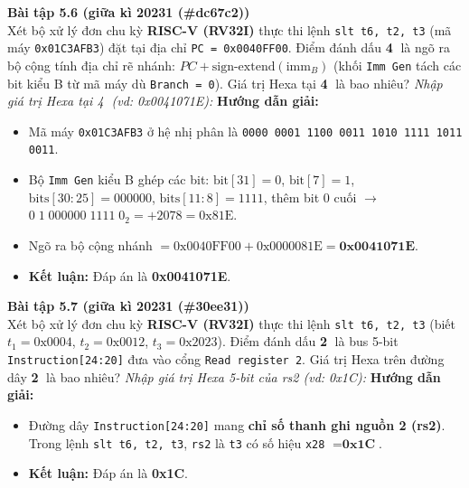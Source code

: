 \textbf{Bài tập 5.6 (giữa kì 20231 (\#dc67c2))}\\
Xét bộ xử lý đơn chu kỳ \textbf{RISC-V (RV32I)} thực thi lệnh \texttt{slt t6, t2, t3} (mã máy \texttt{0x01C3AFB3}) đặt tại địa chỉ \texttt{PC = 0x0040FF00}. Điểm đánh dấu \textbf{\textcircled{4}} là ngõ ra bộ cộng tính địa chỉ rẽ nhánh: $PC + \text{sign-extend}(\text{imm}_B)$ (khối \texttt{Imm Gen} tách các bit kiểu B từ mã máy dù \texttt{Branch = 0}). Giá trị Hexa tại \textbf{\textcircled{4}} là bao nhiêu?
\textit{Nhập giá trị Hexa tại \textcircled{4} (vd: 0x0041071E):}
\textbf{Hướng dẫn giải:}
\begin{itemize}
    \item Mã máy \texttt{0x01C3AFB3} ở hệ nhị phân là \texttt{0000 0001 1100 0011 1010 1111 1011 0011}.
    \item Bộ \texttt{Imm Gen} kiểu B ghép các bit: $\text{bit}[31]=0$, $\text{bit}[7]=1$, $\text{bits}[30:25]=000000$, $\text{bits}[11:8]=1111$, thêm bit $0$ cuối $\rightarrow$ $0\;1\;000000\;1111\;0_2 = +2078 = \text{0x81E}$.
    \item Ngõ ra bộ cộng nhánh $= \text{0x0040FF00} + \text{0x0000081E} = \mathbf{\text{0x0041071E}}$.
    \item \textbf{Kết luận:} Đáp án là \textbf{0x0041071E}.
\end{itemize}

\textbf{Bài tập 5.7 (giữa kì 20231 (\#30ee31))}\\
Xét bộ xử lý đơn chu kỳ \textbf{RISC-V (RV32I)} thực thi lệnh \texttt{slt t6, t2, t3} (biết $t_1 = \text{0x0004}$, $t_2 = \text{0x0012}$, $t_3 = \text{0x2023}$). Điểm đánh dấu \textbf{\textcircled{2}} là bus 5-bit \texttt{Instruction[24:20]} đưa vào cổng \texttt{Read register 2}. Giá trị Hexa trên đường dây \textbf{\textcircled{2}} là bao nhiêu?
\textit{Nhập giá trị Hexa 5-bit của rs2 (vd: 0x1C):}
\textbf{Hướng dẫn giải:}
\begin{itemize}
    \item Đường dây \texttt{Instruction[24:20]} mang \textbf{chỉ số thanh ghi nguồn 2 (rs2)}. Trong lệnh \texttt{slt t6, t2, t3}, \texttt{rs2} là \texttt{t3} có số hiệu \texttt{x28} $= \mathbf{\text{0x1C}}$.
    \item \textbf{Kết luận:} Đáp án là \textbf{0x1C}.
\end{itemize}

